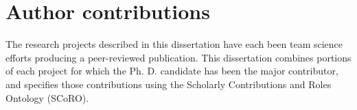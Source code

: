 \section{Author contributions}

The research projects described in this dissertation have each been team science efforts producing a peer-reviewed publication. This dissertation combines portions of each project for which the Ph. D. candidate has been the major contributor, and specifies those contributions using the Scholarly Contributions and Roles Ontology (SCoRO)\cite{Shotton2020-ph}. 